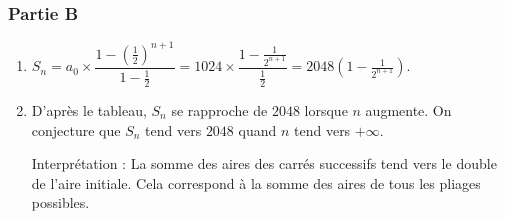 \documentclass[a4paper,12pt]{article}
\begin{document}
\subsubsection*{Partie B}

\begin{enumerate}
\item $S_n = a_0 \times \dfrac{1 - \left(\frac{1}{2}\right)^{n+1}}{1 - \frac{1}{2}} = 1024 \times \dfrac{1 - \frac{1}{2^{n+1}}}{\frac{1}{2}} = 2048 \left(1 - \frac{1}{2^{n+1}}\right)$.
\item D'après le tableau, $S_n$ se rapproche de $2048$ lorsque $n$ augmente. On conjecture que $S_n$ tend vers $2048$ quand $n$ tend vers $+\infty$.

Interprétation : La somme des aires des carrés successifs tend vers le double de l'aire initiale. Cela correspond à la somme des aires de tous les pliages possibles.
\end{enumerate}
\end{document}
